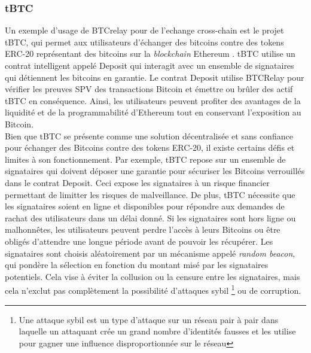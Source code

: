 \subsubsection{tBTC}
Un exemple d'usage de BTCrelay pour de l'echange \gls{cross-chain} est le projet tBTC, qui permet aux utilisateurs d’échanger des bitcoins contre des 
tokens ERC-20 représentant des bitcoins sur la \textit{\gls{blockchain}} Ethereum \cite{hildebrandt2020tokenization,lan2021horizon}. tBTC utilise un contrat intelligent 
appelé Deposit qui interagit avec un ensemble de signataires qui détiennent les bitcoins en garantie. 
Le contrat Deposit utilise BTCRelay pour vérifier les preuves SPV des transactions \gls{Bitcoin} et émettre ou 
brûler des \gls{actif} tBTC en conséquence. Ainsi, les utilisateurs peuvent profiter des avantages de la liquidité 
et de la programmabilité d’\gls{Ethereum} tout en conservant l’exposition au \gls{Bitcoin}. \\
Bien que tBTC se présente comme une solution décentralisée et sans confiance pour échanger des \gls{Bitcoin}s contre 
des tokens ERC-20, il existe certains défis et limites à son fonctionnement. 
Par exemple, tBTC repose sur un ensemble de signataires qui doivent déposer une garantie pour sécuriser les \gls{Bitcoin}s
verrouillés dans le contrat Deposit. Ceci expose les signataires à un risque financier permettant de limitter les risques de malveillance. 
De plus, tBTC nécessite que les signataires soient en ligne et disponibles pour répondre aux demandes de rachat des 
utilisateurs dans un délai donné. Si les signataires sont hors ligne ou malhonnêtes, les utilisateurs peuvent 
perdre l’accès à leurs \gls{Bitcoin}s ou être obligés d’attendre une longue période avant de pouvoir les récupérer. 
Les signataires sont choisis aléatoirement par un mécanisme appelé \textit{random beacon}, qui pondère la sélection en 
fonction du montant misé par les signataires potentiels. Cela vise à éviter la collusion ou la censure entre les 
signataires, mais cela n’exclut pas complètement la possibilité d’attaques sybil \footnote{Une attaque sybil est 
un type d’attaque sur un réseau pair à pair dans laquelle un attaquant crée un grand nombre d’identités fausses 
et les utilise pour gagner une influence disproportionnée sur le réseau} ou de corruption.
